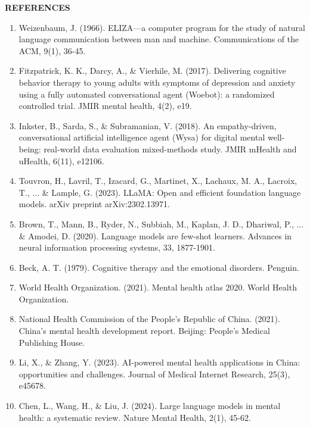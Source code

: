 \newpage
\begin{center}
    {\Large \textbf{REFERENCES}}\\[1cm]
\end{center}

\begin{enumerate}
    \item Weizenbaum, J. (1966). ELIZA—a computer program for the study of natural language communication between man and machine. Communications of the ACM, 9(1), 36-45.
    
    \item Fitzpatrick, K. K., Darcy, A., \& Vierhile, M. (2017). Delivering cognitive behavior therapy to young adults with symptoms of depression and anxiety using a fully automated conversational agent (Woebot): a randomized controlled trial. JMIR mental health, 4(2), e19.
    
    \item Inkster, B., Sarda, S., \& Subramanian, V. (2018). An empathy-driven, conversational artificial intelligence agent (Wysa) for digital mental well-being: real-world data evaluation mixed-methods study. JMIR mHealth and uHealth, 6(11), e12106.
    
    \item Touvron, H., Lavril, T., Izacard, G., Martinet, X., Lachaux, M. A., Lacroix, T., ... \& Lample, G. (2023). LLaMA: Open and efficient foundation language models. arXiv preprint arXiv:2302.13971.
    
    \item Brown, T., Mann, B., Ryder, N., Subbiah, M., Kaplan, J. D., Dhariwal, P., ... \& Amodei, D. (2020). Language models are few-shot learners. Advances in neural information processing systems, 33, 1877-1901.
    
    \item Beck, A. T. (1979). Cognitive therapy and the emotional disorders. Penguin.
    
    \item World Health Organization. (2021). Mental health atlas 2020. World Health Organization.
    
    \item National Health Commission of the People's Republic of China. (2021). China's mental health development report. Beijing: People's Medical Publishing House.
    
    \item Li, X., \& Zhang, Y. (2023). AI-powered mental health applications in China: opportunities and challenges. Journal of Medical Internet Research, 25(3), e45678.
    
    \item Chen, L., Wang, H., \& Liu, J. (2024). Large language models in mental health: a systematic review. Nature Mental Health, 2(1), 45-62.
\end{enumerate} 